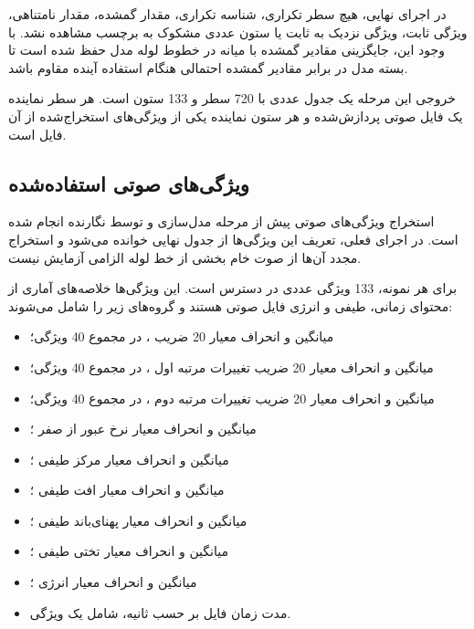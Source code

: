 \documentclass[12pt,a4paper,oneside]{report}
\begin{document}
در اجرای نهایی، هیچ سطر تکراری، شناسه تکراری، مقدار گمشده، مقدار نامتناهی، ویژگی ثابت، ویژگی نزدیک به ثابت یا ستون عددی مشکوک به برچسب مشاهده نشد. با وجود این، جایگزینی مقادیر گمشده با میانه در خطوط لوله مدل حفظ شده است تا بسته مدل در برابر مقادیر گمشده احتمالی هنگام استفاده آینده مقاوم باشد.

خروجی این مرحله یک جدول عددی با 720 سطر و 133 ستون است. هر سطر نماینده یک فایل صوتی پردازش‌شده و هر ستون نماینده یکی از ویژگی‌های استخراج‌شده از آن فایل است.


\subsection{ویژگی‌های صوتی استفاده‌شده}

استخراج ویژگی‌های صوتی پیش از مرحله مدل‌سازی و توسط نگارنده انجام شده است. در اجرای فعلی، تعریف این ویژگی‌ها از جدول نهایی خوانده می‌شود و استخراج مجدد آن‌ها از صوت خام بخشی از خط لوله الزامی آزمایش نیست.

برای هر نمونه، 133 ویژگی عددی در دسترس است. این ویژگی‌ها خلاصه‌های آماری از محتوای زمانی، طیفی و انرژی فایل صوتی هستند و گروه‌های زیر را شامل می‌شوند:

\begin{itemize}
	\item میانگین و انحراف معیار 20 ضریب
	،
	در مجموع 40 ویژگی؛

	\item میانگین و انحراف معیار 20 ضریب تغییرات مرتبه اول
	،
	در مجموع 40 ویژگی؛

	\item میانگین و انحراف معیار 20 ضریب تغییرات مرتبه دوم
	،
	در مجموع 40 ویژگی؛

	\item میانگین و انحراف معیار نرخ عبور از صفر
	؛

	\item میانگین و انحراف معیار مرکز طیفی
	؛

	\item میانگین و انحراف معیار افت طیفی
	؛

	\item میانگین و انحراف معیار پهنای‌باند طیفی
	؛

	\item میانگین و انحراف معیار تختی طیفی
	؛

	\item میانگین و انحراف معیار انرژی
	؛

	\item مدت زمان فایل بر حسب ثانیه، شامل یک ویژگی.
\end{itemize}
\end{document}

